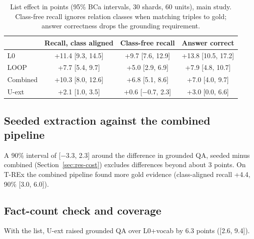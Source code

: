 \begin{table}[!htb]
\centering
\caption{List effect in points (95\% BCa intervals, 30 shards, 60 units), main study. Class-free recall ignores relation classes when matching triples to gold; answer correctness drops the grounding requirement.}
\label{tab:seedalign}
\scriptsize\setlength{\tabcolsep}{2.5pt}
\begin{tabular}{lccc}
\toprule
 & Recall, class aligned & Class-free recall & Answer correct \\
\midrule
L0 & +11.4 [9.3, 14.5] & +9.7 [7.6, 12.9] & +13.8 [10.5, 17.2] \\
LOOP & +7.7 [5.4, 9.7] & +5.0 [2.9, 6.9] & +7.9 [4.8, 10.7] \\
Combined & +10.3 [8.0, 12.6] & +6.8 [5.1, 8.6] & +7.0 [4.0, 9.7] \\
U-ext & +2.1 [1.0, 3.5] & +0.6 [$-$0.7, 2.3] & +3.0 [0.0, 6.6] \\
\bottomrule
\end{tabular}
\end{table}

\subsection{Seeded extraction against the combined pipeline}
A 90\% interval of [$-$3.3, 2.3] around the difference in grounded QA, seeded minus combined (Section~\ref{sec:res-cost}) excludes differences beyond about 3 points. On T-REx the combined pipeline found more gold evidence (class-aligned recall +4.4, 90\% [3.0, 6.0]).

\subsection{Fact-count check and coverage}
With the list, U-ext raised grounded QA over L0+vocab by 6.3 points ([2.6, 9.4]).


